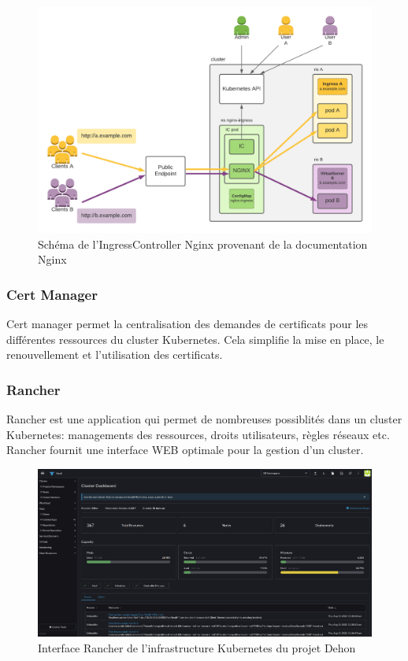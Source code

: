 \documentclass[12pt, a4paper, twoside]{article}
\begin{document}
\begin{figure}[!ht]
    \centering
        \includegraphics[width=\textwidth]{src/graph_nginx.png}
    \caption{Schéma de l'IngressController Nginx provenant de la documentation Nginx}
    \label{fig:graph_nginx.png}
\end{figure}

\subsubsection{Cert Manager}
Cert manager permet la centralisation des demandes de certificats pour les différentes ressources du \gls{cluster} \gls{Kubernetes}.
Cela simplifie la mise en place, le renouvellement et l'utilisation des certificats.

\subsubsection{Rancher}
Rancher est une application qui permet de nombreuses possiblités dans un \gls{cluster} \gls{Kubernetes}: managements des ressources, droits utilisateurs, règles réseaux etc. 
Rancher fournit une interface WEB optimale pour la gestion d'un \gls{cluster}.

\begin{figure}[!ht]
    \centering
        \includegraphics[width=\textwidth]{src/interface_rancher.png}
    \caption{Interface Rancher de l'infrastructure \gls{Kubernetes} du projet Dehon}
    \label{fig:rancher_interface}
\end{figure}
\end{document}

